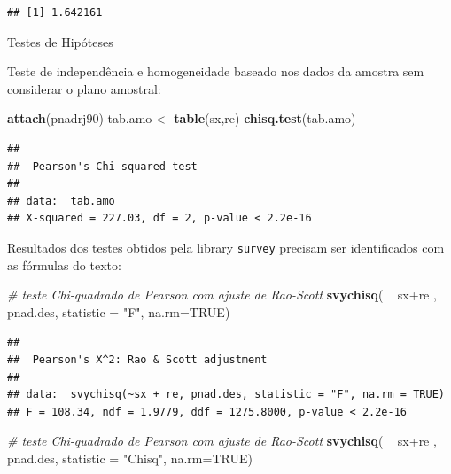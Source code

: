 \documentclass[]{book}
\newenvironment{Shaded}{\begin{snugshade}}{\end{snugshade}}
\newcommand{\KeywordTok}[1]{\textcolor[rgb]{0.13,0.29,0.53}{\textbf{{#1}}}}
\newcommand{\DataTypeTok}[1]{\textcolor[rgb]{0.13,0.29,0.53}{{#1}}}
\newcommand{\StringTok}[1]{\textcolor[rgb]{0.31,0.60,0.02}{{#1}}}
\newcommand{\CommentTok}[1]{\textcolor[rgb]{0.56,0.35,0.01}{\textit{{#1}}}}
\newcommand{\OtherTok}[1]{\textcolor[rgb]{0.56,0.35,0.01}{{#1}}}
\newcommand{\NormalTok}[1]{{#1}}
\numberwithin{example}{chapter}
\numberwithin{remark}{chapter}
\numberwithin{definition}{chapter}
\let\BeginKnitrBlock\begin \let\EndKnitrBlock\end
\begin{document}
\begin{verbatim}
## [1] 1.642161
\end{verbatim}

\BeginKnitrBlock{example}
\protect\hypertarget{ex:unnamed-chunk-134}{}{\label{ex:unnamed-chunk-134}}Testes
de Hipóteses
\EndKnitrBlock{example}

Teste de independência e homogeneidade baseado nos dados da amostra sem
considerar o plano amostral:

\begin{Shaded}
\begin{Highlighting}[]
\KeywordTok{attach}\NormalTok{(pnadrj90)}
\NormalTok{tab.amo <-}\StringTok{ }\KeywordTok{table}\NormalTok{(sx,re)}
\KeywordTok{chisq.test}\NormalTok{(tab.amo)}
\end{Highlighting}
\end{Shaded}

\begin{verbatim}
## 
##  Pearson's Chi-squared test
## 
## data:  tab.amo
## X-squared = 227.03, df = 2, p-value < 2.2e-16
\end{verbatim}

Resultados dos testes obtidos pela library \texttt{survey}
\citep{R-survey} precisam ser identificados com as fórmulas do texto:

\begin{Shaded}
\begin{Highlighting}[]
\CommentTok{# teste Chi-quadrado de Pearson com ajuste de Rao-Scott}
\KeywordTok{svychisq}\NormalTok{( ~}\StringTok{ }\NormalTok{sx+re , pnad.des, }\DataTypeTok{statistic =} \StringTok{"F"}\NormalTok{, }\DataTypeTok{na.rm=}\OtherTok{TRUE}\NormalTok{)}
\end{Highlighting}
\end{Shaded}

\begin{verbatim}
## 
##  Pearson's X^2: Rao & Scott adjustment
## 
## data:  svychisq(~sx + re, pnad.des, statistic = "F", na.rm = TRUE)
## F = 108.34, ndf = 1.9779, ddf = 1275.8000, p-value < 2.2e-16
\end{verbatim}

\begin{Shaded}
\begin{Highlighting}[]
\CommentTok{# teste Chi-quadrado de Pearson com ajuste de Rao-Scott}
\KeywordTok{svychisq}\NormalTok{( ~}\StringTok{ }\NormalTok{sx+re , pnad.des, }\DataTypeTok{statistic =} \StringTok{"Chisq"}\NormalTok{, }\DataTypeTok{na.rm=}\OtherTok{TRUE}\NormalTok{)}
\end{Highlighting}
\end{Shaded}
\end{document}
